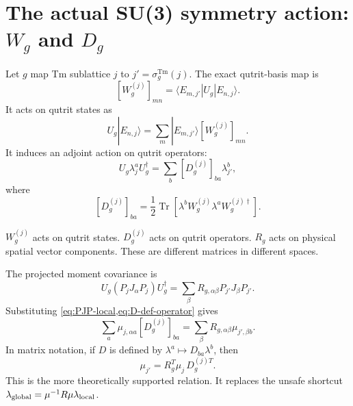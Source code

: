 \documentclass[11pt,a4paper]{article}
\newcommand{\Tm}{\mathrm{Tm}}
\newcommand{\ket}[1]{|#1\rangle}
\newcommand{\bra}[1]{\langle #1|}
\begin{document}
\section{The actual SU(3) symmetry action: $W_g$ and $D_g$}

Let $g$ map Tm sublattice $j$ to $j'=\sigma_g^\Tm(j)$.  The exact qutrit-basis map is
\begin{equation}
  \boxed{
  [W_g^{(j)}]_{mn}=\bra{E_{m,j'}}U_g\ket{E_{n,j}}.}
  \label{eq:W-def}
\end{equation}
It acts on qutrit states as
\begin{equation}
  U_g\ket{E_{n,j}}=\sum_m\ket{E_{m,j'}}[W_g^{(j)}]_{mn}.
\end{equation}
It induces an adjoint action on qutrit operators:
\begin{equation}
  \boxed{
  U_g\lambda_j^aU_g^\dagger=\sum_b\left[D_g^{(j)}\right]_{ba}\lambda_{j'}^b,}
  \label{eq:D-def-operator}
\end{equation}
where
\begin{equation}
  \boxed{
  \left[D_g^{(j)}\right]_{ba}=\frac12\operatorname{Tr}\left[\lambda^b W_g^{(j)}\lambda^a W_g^{(j)\dagger}\right].}
  \label{eq:D-def}
\end{equation}

\begin{keybox}
$W_g^{(j)}$ acts on qutrit states.  $D_g^{(j)}$ acts on qutrit operators.  $R_g$ acts on physical spatial vector components.  These are different matrices in different spaces.
\end{keybox}

The projected moment covariance is
\begin{equation}
  U_g(P_jJ_\alpha P_j)U_g^\dagger
  =\sum_\beta R_{g,\alpha\beta}
  P_{j'}J_\beta P_{j'}.
\end{equation}
Substituting \cref{eq:PJP-local,eq:D-def-operator} gives
\begin{equation}
  \boxed{
  \sum_a \mu_{j,\alpha a}\left[D_g^{(j)}\right]_{ba}
  =\sum_\beta R_{g,\alpha\beta}\mu_{j',\beta b}.}
  \label{eq:mu-covariance-index}
\end{equation}
In matrix notation, if $D$ is defined by $\lambda^a\mapsto D_{ba}\lambda^b$, then
\begin{equation}
  \boxed{
  \mu_{j'}=R_g^T\mu_j\,D_g^{(j)T}.}
  \label{eq:mu-covariance}
\end{equation}
This is the more theoretically supported relation.  It replaces the unsafe shortcut $\lambda_{\rm global}=\mu^{-1}R\mu\lambda_{\rm local}$.
\end{document}
